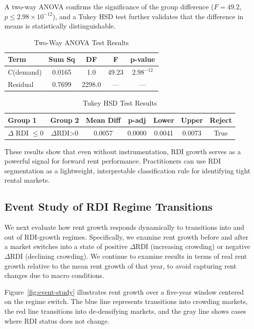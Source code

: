 \documentclass[APA,Times1COL]{WileyNJDv5} %
\begin{document}
A two-way ANOVA confirms the significance of the group difference ($F = 49.2$, $p \leq 2.98 \times 10^{-12}$), and a Tukey HSD test further validates that the difference in means is statistically distinguishable.
\begin{table}[h]
	\centering
	\caption{Two-Way ANOVA Test Results}
	\label{tab:two-way-anova}
	\begin{tabular}{lcccc} \toprule
		Term & Sum Sq & DF & F & p-value \\ \midrule
		C(demand) & 0.0165 & 1.0 & 49.23 &  $2.98^{-12}$\\
		Residual & 0.7699 & 2298.0 & --- & --- \\
		\bottomrule
	\end{tabular}
\end{table}

\begin{table}[h]
	\centering
	\caption{Tukey HSD Test Results}
	\label{tab:tukey}
	
	\begin{tabular}{lcccccc} \toprule
		Group 1 & Group 2 & Mean Diff & p-adj & Lower & Upper & Reject \\ \midrule
		$\Delta$ RDI $\leq$0 & $\Delta$RDI>0 & 0.0057 & 0.0000 & 0.0041 & 0.0073 & True \\
		\bottomrule
	\end{tabular}
\end{table}

These results show that even without instrumentation, RDI growth serves as a powerful signal for forward rent performance. Practitioners can use RDI segmentation as a lightweight, interpretable classification rule for identifying tight rental markets.

\subsection{Event Study of RDI Regime Transitions}
We next evaluate how rent growth responds dynamically to transitions into and out of RDI-growth regimes. Specifically, we examine rent growth before and after a market switches into a state of positive  $\Delta$RDI (increasing crowding) or  negative  $\Delta$RDI (declining crowding). We continue to examine results in terms of real rent growth relative to the mean rent growth of that year, to avoid capturing rent changes due to macro conditions.

Figure~\ref{fig:event-study} illustrates rent growth over a five-year window centered on the regime switch. The blue line represents transitions into crowding markets, the red line transitions into de-densifying markets, and the gray line shows cases where RDI status does not change.
\end{document}

